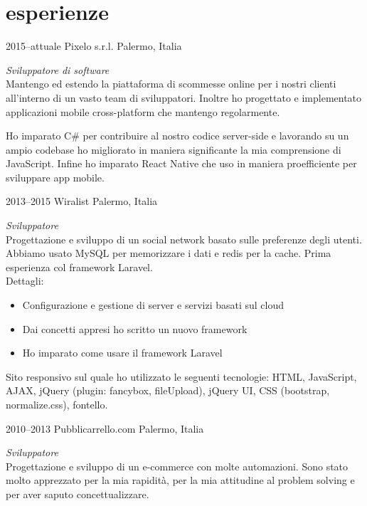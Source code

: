 \documentclass[]{friggeri-cv} %
\begin{document}
\section{esperienze}
\begin{entrylist}
\entry
{2015--attuale}
{Pixelo s.r.l.}
{Palermo, Italia}
{\emph{Sviluppatore di software} \\
Mantengo ed estendo la piattaforma di scommesse online per i nostri clienti
all'interno di un vasto team di sviluppatori. Inoltre ho progettato e
implementato applicazioni mobile cross-platform che mantengo regolarmente.

Ho imparato C\# per contribuire al nostro codice server-side e lavorando su un
ampio codebase ho migliorato in maniera significante la mia comprensione di
JavaScript. Infine ho imparato React Native che uso in maniera proefficiente
per sviluppare app mobile.
}
\entry
{2013--2015}
{Wiralist}
{Palermo, Italia}
{\emph{Sviluppatore} \\
Progettazione e sviluppo di un social network basato sulle preferenze degli utenti. Abbiamo usato MySQL per memorizzare i dati e redis per la cache. Prima esperienza col framework Laravel. \\
Dettagli:
\begin{itemize}
\item Configurazione e gestione di server e servizi basati sul cloud
\item Dai concetti appresi ho scritto un nuovo framework
\item Ho imparato come usare il framework Laravel
\end{itemize}

Sito responsivo sul quale ho utilizzato le seguenti tecnologie: HTML,
JavaScript, AJAX, jQuery (plugin: fancybox, fileUpload), jQuery UI,
CSS (bootstrap, normalize.css), fontello.
}
\entry
{2010--2013}
{Pubblicarrello.com}
{Palermo, Italia}
{\emph{Sviluppatore} \\
Progettazione e sviluppo di un e-commerce con molte automazioni. Sono stato molto
apprezzato per la mia rapidità, per la mia attitudine al problem solving e per
aver saputo concettualizzare.

}
\end{entrylist}
\end{document}
